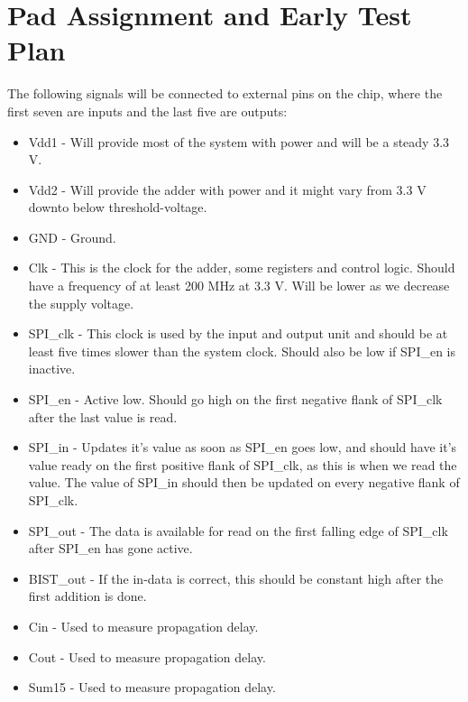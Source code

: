 \section{Pad Assignment and Early Test Plan}
The following signals will be connected to external pins on the chip, where the first seven are inputs and the last five are outputs:
\begin{itemize}
	\item Vdd1 - Will provide most of the system with power and will be a steady 3.3 V.
	\item Vdd2 - Will provide the adder with power and it might vary from 3.3 V downto below threshold-voltage.
	\item GND - Ground.
	\item Clk - This is the clock for the adder, some registers and control logic. Should have a frequency of at least 200 MHz at 3.3 V. Will be lower as we decrease the supply voltage.
	\item SPI\_clk - This clock is used by the input and output unit and should be at least five times slower than the system clock. Should also be low if SPI\_en is inactive.
	\item SPI\_en - Active low. Should go high on the first negative flank of SPI\_clk after the last value is read.
	\item SPI\_in - Updates it's value as soon as SPI\_en goes low, and should have it's value ready on the first positive flank of SPI\_clk, as this is when we read the value. The value of SPI\_in should then be updated on every negative flank of SPI\_clk.
	\item SPI\_out - The data is available for read on the first falling edge of SPI\_clk after SPI\_en has gone active.
	\item BIST\_out - If the in-data is correct, this should be constant high after the first addition is done. 
	\item Cin - Used to measure propagation delay.
	\item Cout - Used to measure propagation delay.
	\item Sum15 - Used to measure propagation delay.
\end{itemize}
 
